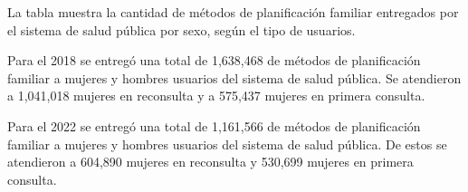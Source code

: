 La tabla muestra la cantidad de métodos de planificación familiar entregados por el sistema de salud pública por sexo, según el tipo de usuarios.

Para el 2018 se entregó una total de 1,638,468 de métodos de planificación familiar a mujeres y hombres usuarios del sistema de salud pública. Se atendieron a 1,041,018 mujeres en reconsulta y a 575,437 mujeres en primera consulta. 

Para el 2022 se entregó una total de 1,161,566 de métodos de planificación familiar a mujeres y hombres usuarios del sistema de salud pública. De estos se atendieron a 604,890 mujeres en reconsulta y 530,699 mujeres en primera consulta. 
